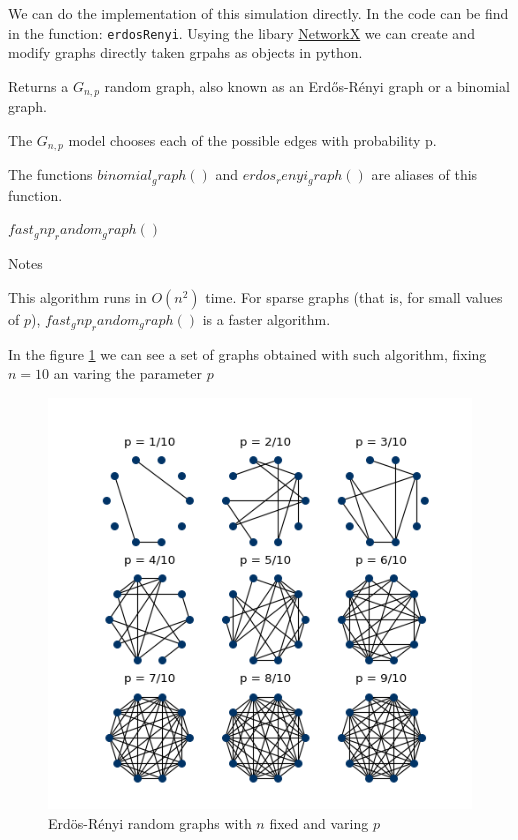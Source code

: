 We can do the implementation of this simulation directly. In the code can be find in the function: \texttt{erdosRenyi}. Usying the libary \href{https://networkx.github.io/}{NetworkX} we can create and modify graphs directly taken grpahs as objects in python.

Returns a $G_{n,p}$ random graph, also known as an Erdős-Rényi graph or a binomial graph.

The $G_{n,p}$ model chooses each of the possible edges with probability p.

The functions $binomial_graph()$ and $erdos_renyi_graph()$ are aliases of this function.


$fast_gnp_random_graph()$

Notes

This algorithm runs in $O(n^2)$ time. For sparse graphs (that is, for small values of $p$), $fast_gnp_random_graph()$ is a faster algorithm.

In the figure \ref{fig:ErdosRenyi10} we can see a set of graphs obtained with such algorithm, fixing $n=10$ an varing the parameter $p$
\begin{figure}[h!]
	\centering
	\includegraphics[scale=1]{Figures/ER-10.png}
	\caption{Erdös-Rényi random graphs with $n$ fixed and varing $p$}
	\label{fig:ErdosRenyi10}
\end{figure}

